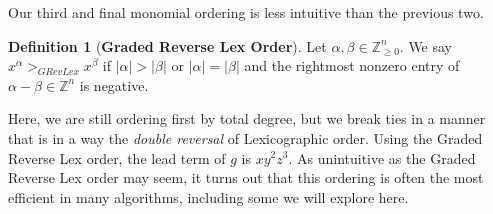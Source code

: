 \documentclass[MS, xcolor=dvipsnames]{wfuthesis}
\def\bZ{\mathbb{Z}}
\theoremstyle{definition}
\newtheorem{definition}[theorem]{Definition}
\begin{document}
Our third and final monomial ordering is less intuitive than the previous two.
\begin{definition}[\bf Graded Reverse Lex Order]
  Let $\alpha,\beta \in \bZ_{\ge0}^n$. We say $x^\alpha >_{GRevLex} x^\beta$ if $|\alpha| > |\beta|$ or $|\alpha|=|\beta|$ and the rightmost nonzero entry of $\alpha - \beta \in \bZ^n$ is negative.
\end{definition}
Here, we are still ordering first by total degree, but we break ties in a manner that is in a way the \emph{double reversal} of Lexicographic order. Using the Graded Reverse Lex order, the lead term of $g$ is $xy^2z^3$. As unintuitive as the Graded Reverse Lex order may seem, it turns out that this ordering is often the most efficient in many algorithms, including some we will explore here.

\end{document}

